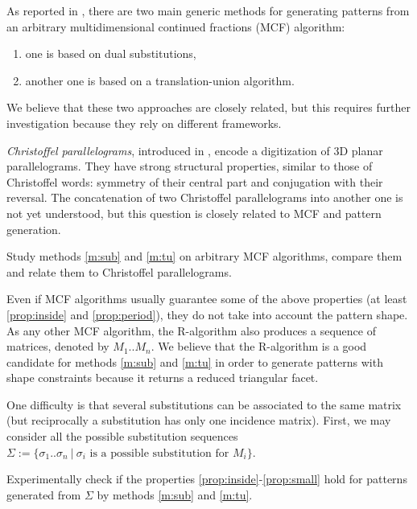 As reported in , there are two main generic methods for generating patterns
from an arbitrary multidimensional continued fractions (MCF) algorithm:
\begin{enumerate}[label=(M\arabic*)]
\item one is based on dual substitutions, \label{m:sub}
\item another one is based on a translation-union algorithm. \label{m:tu}
\end{enumerate}
We believe that these two approaches are closely related, but this requires
further investigation because they rely on different frameworks. 

\emph{Christoffel parallelograms}, introduced in \cite{Labbe2015},
encode a digitization of 3D planar parallelograms. They have strong
structural properties, similar to those of Christoffel words:
symmetry of their central part and conjugation with their reversal.
The concatenation of two Christoffel parallelograms into another one
is not yet understood, but this question is closely related to MCF
and pattern generation. 

\begin{Task}
  \label{task:genmeth}
  Study methods \ref{m:sub} and \ref{m:tu} on arbitrary MCF algorithms,
  compare them and relate them to Christoffel parallelograms.   
\end{Task}

Even if MCF algorithms usually guarantee some of the above properties
(at least \ref{prop:inside} and \ref{prop:period}),
they do not take into account the pattern shape. As any other MCF algorithm, the R-algorithm
also produces a sequence of matrices, denoted by $M_1..M_n$. We believe that the R-algorithm
is a good candidate for methods \ref{m:sub} and \ref{m:tu} in order to generate patterns with shape
constraints because it returns a reduced triangular facet.

One difficulty is that several substitutions can be associated to the same matrix
(but reciprocally a substitution has only one incidence matrix). First, we may consider all the possible
substitution sequences
$\Sigma := \{ \sigma_1..\sigma_n \ | \ \sigma_i \text{ is a possible substitution for } M_i \}$.

\begin{Task}
  \label{task:genexp}
  Experimentally check if the properties \ref{prop:inside}-\ref{prop:small}
  hold for patterns generated from $\Sigma$ by methods \ref{m:sub} and \ref{m:tu}.  
\end{Task}

